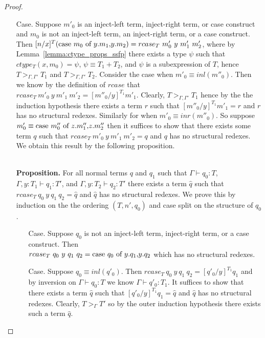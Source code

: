 \begin{proof}
\begin{itemize}
\begin{itemize}
  \item[Case.] Suppose $m'_0$ is an inject-left term, inject-right term, or case construct and $m_0$ is not
    an inject-left term, an inject-right term, or a case construct.  Then
    $[n/x]^{T} (\mbox{case}\ m_0\ \text{of}\ y\text{.}m_1\text{,}y\text{.}m_2) = rcase_{T}\ m'_0\ y\ m'_1\ m'_2$, where by \\
    Lemma~\ref{lemma:ctype_props_ssfp}
    there exists a type $\psi$ such that $ctype_T(x,m_0) = \psi$, $\psi \equiv T_1+T_2$, and $\psi$ is a subexpression
    of $T$, hence $T >_{\Gamma,\Gamma'} T_1$ and $T >_{\Gamma,\Gamma'} T_2$.
    Consider the case when $m'_0 \equiv inl(m''_0)$.  Then we know by the definition of $rcase$ that
    $rcase_{T}\ m'_0\ y\ m'_1\ m'_2 = [m''_0/y]^{T_1} m'_1$.  Clearly, $T >_{\Gamma,\Gamma'} T_1$ hence
    by the the induction hypothesis there exists a term $r$ such that $[m''_0/y]^{T_1} m'_1 = r$ and
    $r$ has no structural redexes. Similarly for when $m'_0 \equiv inr(m''_0)$.  
    So suppose $m'_0 \equiv \mbox{case}\ m''_0\ \text{of}\ z\text{.}m''_1\text{,}z\text{.}m''_2$ then it suffices to show that there exists some term
    $q$ such that $rcase_{T}\ m'_0\ y\ m'_1\ m'_2 = q$ and $q$ has no structural redexes.  We obtain this
    result by the following proposition.
      
    \ \\
    {\bf Proposition.} For all normal terms $q$ and $q_1$ such that 
    $\Gamma \vdash q_0:T$, $\Gamma, y:T_1 \vdash q_1:T'$, 
    and $\Gamma, y:T_2 \vdash q_2:T'$ there exists a term $\hat{q}$ such that 
    $rcase_{T}\ q_0\ y\ q_1\ q_2 = \hat{q}$ and $\hat{q}$ has no structural redexes.
    We prove this by induction on the the ordering $(T, n', q_0)$ and case split on the structure of $q_0$.
    \begin{itemize}
    \item[Case.] Suppose $q_0$ is not an inject-left term, inject-right term, or a case construct.  Then\\
      $rcase_{T}\ q_0\ y\ q_1\ q_2 = \mbox{case}\ q_0\ \text{of}\ y\text{.}q_1\text{,}y\text{.}q_2$ which has no structural redexes.
      
    \item[Case.] Suppose $q_0 \equiv inl(q'_0)$.  Then $rcase_{T}\ q_0\ y\ q_1\ q_2 = [q'_0/y]^{T_1} q_1$ and
      by inversion on $\Gamma \vdash q_0:T$ we know $\Gamma \vdash q'_0:T_1$.  It suffices to show that there
      exists a term $\hat{q}$ such that $[q'_0/y]^{T_1} q_1 = \hat{q}$  and $\hat{q}$ has no structural redexes.
      Clearly, $T >_{\Gamma} T'$ so by the outer induction hypothesis there exists such a term $\hat{q}$.
      

\end{itemize}
\end{itemize}
\end{itemize}
\end{proof}
